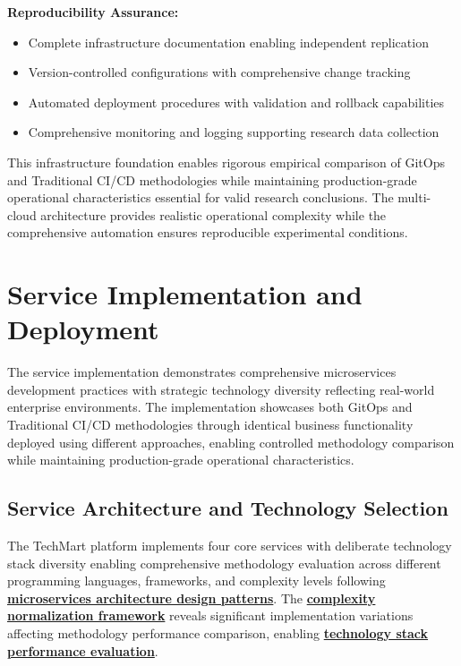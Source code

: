 \textbf{Reproducibility Assurance:}
\begin{itemize}
\item Complete infrastructure documentation enabling independent replication
\item Version-controlled configurations with comprehensive change tracking
\item Automated deployment procedures with validation and rollback capabilities
\item Comprehensive monitoring and logging supporting research data collection
\end{itemize}

This infrastructure foundation enables rigorous empirical comparison of GitOps and Traditional CI/CD methodologies while maintaining production-grade operational characteristics essential for valid research conclusions. The multi-cloud architecture provides realistic operational complexity while the comprehensive automation ensures reproducible experimental conditions.

\section{Service Implementation and Deployment}

The service implementation demonstrates comprehensive microservices development practices with strategic technology diversity reflecting real-world enterprise environments. The implementation showcases both GitOps and Traditional CI/CD methodologies through identical business functionality deployed using different approaches, enabling controlled methodology comparison while maintaining production-grade operational characteristics.

\subsection{Service Architecture and Technology Selection}

The TechMart platform implements four core services with deliberate technology stack diversity enabling comprehensive methodology evaluation across different programming languages, frameworks, and complexity levels following \textbf{\hyperref[microservices_patterns]{microservices architecture design patterns}}. The \textbf{\hyperref[software_complexity_metrics]{complexity normalization framework}} reveals significant implementation variations affecting methodology performance comparison, enabling \textbf{\hyperref[fenton2014software]{technology stack performance evaluation}}.

